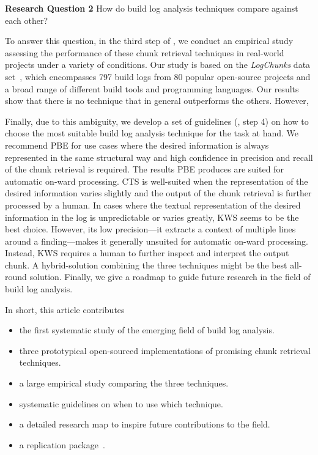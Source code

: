 \begin{simplebox}[minipage boxed title*=-5cm]{\textbf{Research Question
2}}
How do build log analysis techniques compare against each other?
\end{simplebox}


To answer this question, in the third step  of ,
we conduct an empirical study assessing the performance
of these chunk retrieval techniques in
real-world projects under a variety of conditions.
Our study is based on the \emph{LogChunks} data
set~\cite{brandt2020logchunks}, which encompasses 797 build logs from
80 popular open-source projects and a broad range of different
build tools and programming languages.
Our results show that there is no technique that in general outperforms
the others.
However,

Finally, due to this ambiguity, we develop a set of guidelines
(, step 4)
on how to choose the most suitable build log analysis
technique for the task at hand.
We recommend PBE for use cases where the desired information is always
represented in the same structural way and high confidence in
precision and recall of the chunk retrieval is required.
The results PBE produces are suited for automatic on-ward processing.
CTS is
well-suited when the representation of the desired information varies
slightly and the output of the chunk retrieval is further processed by
a human.
In cases where the textual representation of the desired
information in the log is unpredictable or varies greatly, KWS seems
to be the best choice.
However, its low precision---it extracts a
context of multiple lines around a finding---makes it generally
unsuited for automatic on-ward processing.
Instead, KWS requires a human
to further inspect and interpret the output chunk.
A hybrid-solution combining the three techniques might be the best
all-round solution.
Finally, we give a roadmap to guide future research in the field
of build log analysis.

In short, this article contributes
\begin{itemize}
\item the first systematic study of the emerging field of build log
analysis.
\item three prototypical open-sourced implementations of
promising chunk retrieval techniques.
\item a large empirical study comparing the three techniques.
\item systematic guidelines on when to use which technique.
\item a detailed research map to inspire future contributions to the
field.
\item a replication package~\cite{brandt2020chunk-replication}.
\end{itemize}


